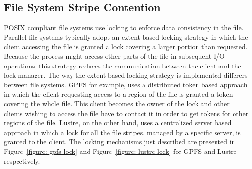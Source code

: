 \subsection{File System Stripe Contention}
POSIX compliant file systems use locking to enforce data consistency in the file. Parallel file systems typically adopt an extent based locking strategy in which the client accessing the file
is granted a lock covering a larger portion than requested. Because the process might access other parts of the file in subsequent I/O operations, this strategy reduces the communication between 
the client and the lock manager. The way the extent based locking strategy is implemented differers between file systems. GPFS for example, uses a distributed token based approach in which the 
client requesting access to a region of the file is granted a token covering the whole file. This client becomes the owner of the lock and other clients wishing to access the file have to contact 
it in order to get tokens for other regions of the file. Lustre, on the other hand, uses a centralized server based approach in which a lock for all the file stripes, managed by a specific server,
is granted to the client. The locking mechanisms just described are presented in Figure~\ref{figure: gpfs-lock} and Figure~\ref{figure: lustre-lock} for GPFS and Lustre respectively.

